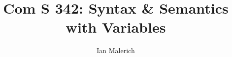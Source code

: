 \documentclass{jhwhw}
\author{Ian Malerich}
\title{Com S 342: Syntax \& Semantics with Variables}
\begin{document}
\problem{}
\end{document}
